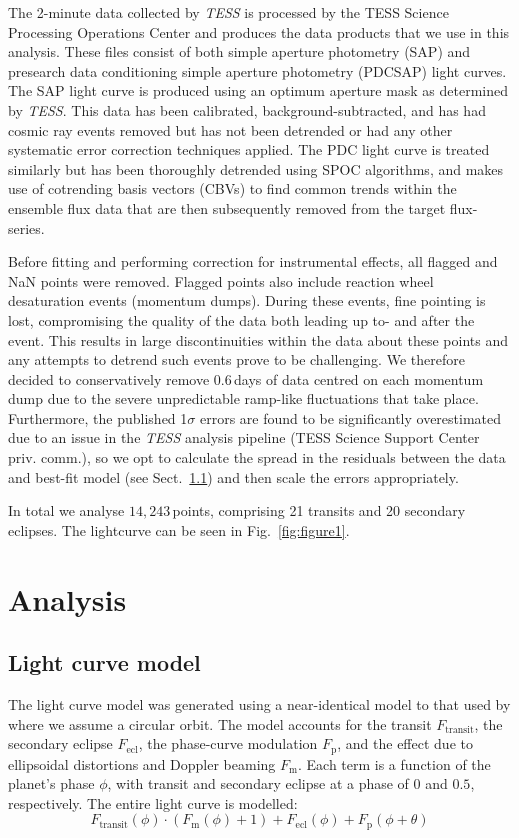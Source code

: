 \documentclass[fleqn,usenatbib]{mnras}
\begin{document}
The 2-minute data collected by \textit{TESS} is processed by the TESS Science Processing Operations Center \citep[SPOC,][]{spoc} and produces the data products that we use in this analysis. These files consist of both simple aperture photometry (SAP) and presearch data conditioning simple aperture photometry (PDCSAP) light curves. The SAP light curve is produced using an optimum aperture mask as determined by \textit{TESS}. This data has been calibrated, background-subtracted, and has had cosmic ray events removed but has not been detrended or had any other systematic error correction techniques applied. The PDC light curve is treated similarly but has been thoroughly detrended using SPOC algorithms, and makes use of cotrending basis vectors (CBVs) to find common trends within the ensemble flux data that are then subsequently removed from the target flux-series.

Before fitting and performing correction for instrumental effects, all flagged and NaN points were removed. Flagged points also include reaction wheel desaturation events (momentum dumps). During these events, fine pointing is lost, compromising the quality of the data both leading up to- and after the event. This results in large discontinuities within the data about these points and any attempts to detrend such events prove to be challenging. We therefore decided to conservatively remove $0.6$\,days of data centred on each momentum dump due to the severe unpredictable ramp-like fluctuations that take place. Furthermore, the published 1$\sigma$ errors are found to be significantly overestimated due to an issue in the \textit{TESS} analysis pipeline (TESS Science Support Center priv. comm.), so we opt to calculate the spread in the residuals between the data and best-fit model (see Sect.~\ref{sec:phasecurve}) and then scale the errors appropriately.

In total we analyse $14,243$\,points, comprising 21 transits and 20 secondary eclipses. The lightcurve can be seen in Fig.~\ref{fig:figure1}.

\section{Analysis}\label{analysis}
\subsection{\textbf{Light curve model}}\label{sec:phasecurve}
The light curve model was generated using a near-identical model to that used by \citet{esteves2013, esteves2015} where we assume a circular orbit. The model accounts for the transit $F_\mathrm{transit}$, the secondary eclipse $F_\mathrm{ecl}$, the phase-curve modulation $F_\mathrm{p}$, and the effect due to ellipsoidal distortions and Doppler beaming $F_{\mathrm{m}}$. Each term is a function of the planet's phase $\phi$, with transit and secondary eclipse at a phase of $0$ and $0.5$, respectively. The entire light curve is modelled:
\begin{equation}
    F_{\mathrm{transit}}(\phi) \cdot (F_{\mathrm{m}}(\phi)+1) + F_{\mathrm{ecl}}(\phi) + F_{\mathrm{p}}(\phi + \theta)
	\label{eq:phasecurve}
\end{equation}
\end{document}
